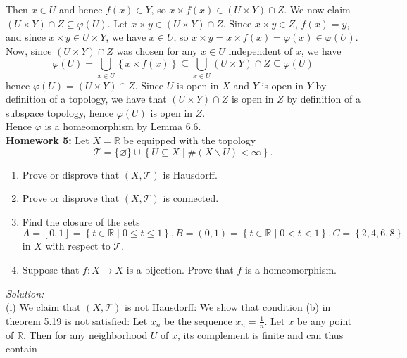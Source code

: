 \documentclass[a4paper]{article}
\begin{document}
    Then $x \in U$ and hence $f(x) \in Y$, so
    $x \times f(x) \in \left( U \times Y \right) \cap Z$. We now claim
    $\left( U \times Y \right) \cap Z \subseteq \varphi(U)$. Let
    $x \times y \in \left( U \times Y \right) \cap Z$. Since
    $x \times y \in Z$, $f(x) = y$, and since $x \times y \in U \times Y$, we
    have $x \in U$, so $x \times y = x \times f(x) = \varphi(x) \in
    \varphi(U)$.\\
    Now, since $(U \times Y) \cap Z$ was chosen for any $x \in U$ independent
    of $x$, we have
    \[
    \varphi(U) = \bigcup_{x \in U} \left\{ x \times f(x) \right\} 
    \subseteq \bigcup_{x \in U} \left( U \times Y \right) \cap Z
    \subseteq \varphi(U)
    \] 
    hence $\varphi(U) = \left( U\times Y \right) \cap Z$.
    Since $U$ is open in $X$ and $Y$ is open in $Y$ by
    definition of a topology, we have that $\left( U \times Y \right) \cap Z$ 
    is open in $Z$ by definition of a subspace topology, hence
    $\varphi(U)$ is open in $Z$.\\
    Hence $\varphi$ is a homeomorphism by Lemma 6.6.\\
    \linebreak
    \textbf{Homework 5:} Let $X = \mathbb{R}$ be equipped with the topology
    \[
        \mathcal{T} = \{\varnothing\} \cup \left\{ U \subseteq X
         \mid \# (X \backslash U) < \infty \right\} 
    .\] 
    \begin{enumerate}[label=(\roman*)]
        \item Prove or disprove that $(X, \mathcal{T})$ is Hausdorff.
        \item Prove or disprove that $(X, \mathcal{T})$ is connected.
        \item Find the closure of the sets $A = [0,1] = \left\{ t \in \mathbb{R}
             \mid 0 \le t \le 1 \right\} , B = (0,1)
             = \left\{ t \in \mathbb{R} \mid 0 < t < 1 \right\} ,
             C = \left\{ 2,4,6,8 \right\} $ in $X$ with respect to
             $\mathcal{T}$.
         \item Suppose that $f \colon X \to X$ is a bijection. Prove that
             $f$ is a homeomorphism.
    \end{enumerate}
    \textit{Solution:}\\
    (i) We claim that $(X, \mathcal{T})$ is not Hausdorff: We show that
    condition (b) in theorem 5.19 is not satisfied: Let $x_n$ be the
    sequence $x_n = \frac{1}{n}$. Let $x$ be any point of $\mathbb{R}$. Then
    for any neighborhood $U$ of $x$, its complement is finite and can thus contain
\end{document}
